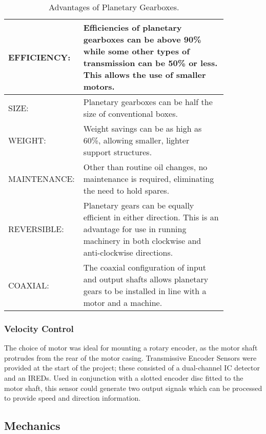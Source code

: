 \begin{table}[!htb]
\centering
\begin{tabular}{|p{0.2\linewidth}|p{0.65\linewidth}|}
\hline
EFFICIENCY:  & Efficiencies of planetary gearboxes can be above 90\% while some other types of transmission can be 50\% or less. This allows the use of smaller motors.\\ \hline
SIZE:        & Planetary gearboxes can be half the size of conventional boxes.\\ \hline
WEIGHT:      & Weight savings can be as high as 60\%, allowing smaller, lighter support structures.\\ \hline
MAINTENANCE: & Other than routine oil changes, no maintenance is required, eliminating the need to hold spares.\\ \hline
REVERSIBLE:  & Planetary gears can be equally efficient in either direction. This is an advantage for use in running machinery in both clockwise and anti-clockwise directions.\\ \hline
COAXIAL:     & The coaxial configuration of input and output shafts allows planetary gears to be installed in line with a motor and a machine.\\ \hline
\end{tabular}
\caption{Advantages of Planetary Gearboxes. \cite{Dun_dcmotor}}
\label{tab:gearbox}
\end{table}

\subsubsection{Velocity Control}
The choice of motor was ideal for mounting a rotary encoder, as the motor shaft protrudes from the rear of the motor casing. Transmissive Encoder Sensors were provided at the start of the project; these consisted of a dual-channel IC detector and an \glspl{IRED}. Used in conjunction with a slotted encoder disc fitted to the motor shaft, this sensor could generate two output signals which can be processed to provide speed and direction information. \cite{Dun_encoder}

\subsection{Mechanics}
